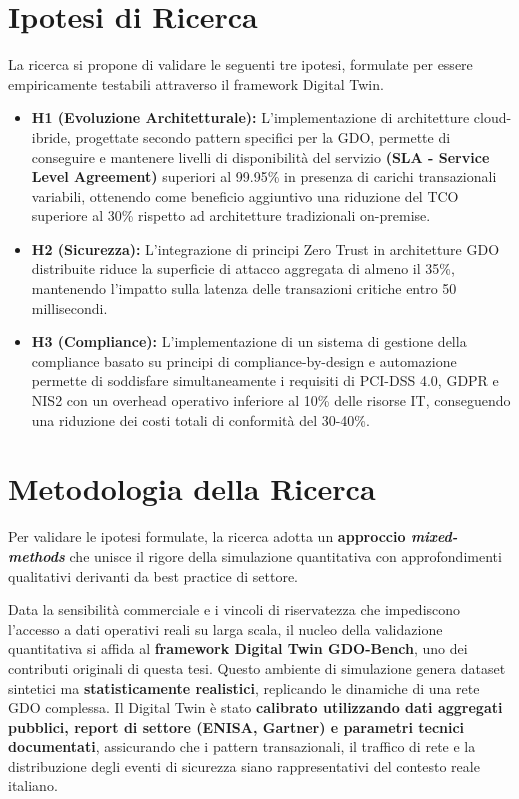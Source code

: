 \section{Ipotesi di Ricerca}
La ricerca si propone di validare le seguenti tre ipotesi, formulate per essere empiricamente testabili attraverso il framework Digital Twin.
\begin{itemize}
    \item \textbf{H1 (Evoluzione Architetturale):} L'implementazione di architetture cloud-ibride, progettate secondo pattern specifici per la GDO, permette di conseguire e mantenere livelli di disponibilità del servizio \textbf{(SLA - Service Level Agreement)} superiori al 99.95\% in presenza di carichi transazionali variabili, ottenendo come beneficio aggiuntivo una riduzione del TCO superiore al 30\% rispetto ad architetture tradizionali on-premise.
    \item \textbf{H2 (Sicurezza):} L'integrazione di principi Zero Trust in architetture GDO distribuite riduce la superficie di attacco aggregata di almeno il 35\%, mantenendo l'impatto sulla latenza delle transazioni critiche entro 50 millisecondi.
    \item \textbf{H3 (Compliance):} L'implementazione di un sistema di gestione della compliance basato su principi di compliance-by-design e automazione permette di soddisfare simultaneamente i requisiti di PCI-DSS 4.0, GDPR e NIS2 con un overhead operativo inferiore al 10\% delle risorse IT, conseguendo una riduzione dei costi totali di conformità del 30-40\%.
\end{itemize}

\section{Metodologia della Ricerca}
Per validare le ipotesi formulate, la ricerca adotta un \textbf{approccio \textit{mixed-methods}} che unisce il rigore della simulazione quantitativa con approfondimenti qualitativi derivanti da best practice di settore.

Data la sensibilità commerciale e i vincoli di riservatezza che impediscono l'accesso a dati operativi reali su larga scala, il nucleo della validazione quantitativa si affida al \textbf{framework Digital Twin GDO-Bench}, uno dei contributi originali di questa tesi. Questo ambiente di simulazione genera dataset sintetici ma \textbf{statisticamente realistici}, replicando le dinamiche di una rete GDO complessa. Il Digital Twin è stato \textbf{calibrato utilizzando dati aggregati pubblici, report di settore (ENISA, Gartner) e parametri tecnici documentati}, assicurando che i pattern transazionali, il traffico di rete e la distribuzione degli eventi di sicurezza siano rappresentativi del contesto reale italiano.

